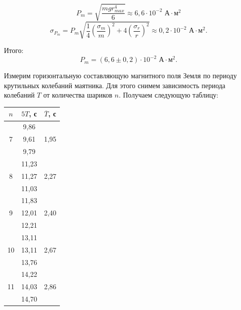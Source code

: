 \documentclass[a4paper,12pt]{article} %
\begin{document}
\begin{equation*}
	P_m = \sqrt{\frac{mgr_{max}^4}{6}} \approx 6,6 \cdot 10^{-2} \text{ А}\cdot \text{м}^2
\end{equation*}
\begin{equation*}
	\sigma_{P_m} = P_m \sqrt{\frac{1}{4}\left(\frac{\sigma_m}{m}\right)^2 + 4\left(\frac{\sigma_r}{r}\right)^2} \approx 0,2 \cdot 10^{-2} \text{ А}\cdot \text{м}^2.
\end{equation*}

Итого:
\begin{equation*}
	P_m = (6,6 \pm 0,2)\cdot 10^{-2} \text{ А}\cdot \text{м}^2.
\end{equation*}
\vspace{7mm}

Измерим горизонтальную составляющую магнитного поля Земля по периоду крутильных колебаний маятника.
Для этого снимем зависимость периода колебаний $T$ от количества шариков $n$.
Получаем следующую таблицу: 


\begin{table}[h!]
	\centering
	\renewcommand{\tabcolsep}{1.5cm}
	\begin{tabular}{|c|c|c|}
		\hline
		$n$                 & $5T$, с & $\overline{T}$, с     \\ \hline
		\multirow{3}{*}{7}  & 9,86    & \multirow{3}{*}{1,95} \\ \cline{2-2}
		& 9,61    &                       \\ \cline{2-2}
		& 9,79    &                       \\ \hline
		\multirow{3}{*}{8}  & 11,23   & \multirow{3}{*}{2,27} \\ \cline{2-2}
		& 11,27   &                       \\ \cline{2-2}
		& 11,03   &                       \\ \hline
		\multirow{3}{*}{9}  & 11,83   & \multirow{3}{*}{2,40} \\ \cline{2-2}
		& 12,01   &                       \\ \cline{2-2}
		& 12,21   &                       \\ \hline
		\multirow{3}{*}{10} & 13,11   & \multirow{3}{*}{2,67} \\ \cline{2-2}
		& 13,11   &                       \\ \cline{2-2}
		& 13,76   &                       \\ \hline
		\multirow{3}{*}{11} & 14,22   & \multirow{3}{*}{2,86} \\ \cline{2-2}
		& 14,03   &                       \\ \cline{2-2}
		& 14,70   &                       \\ \hline
	\end{tabular}
\end{table}
\newpage
\end{document}
